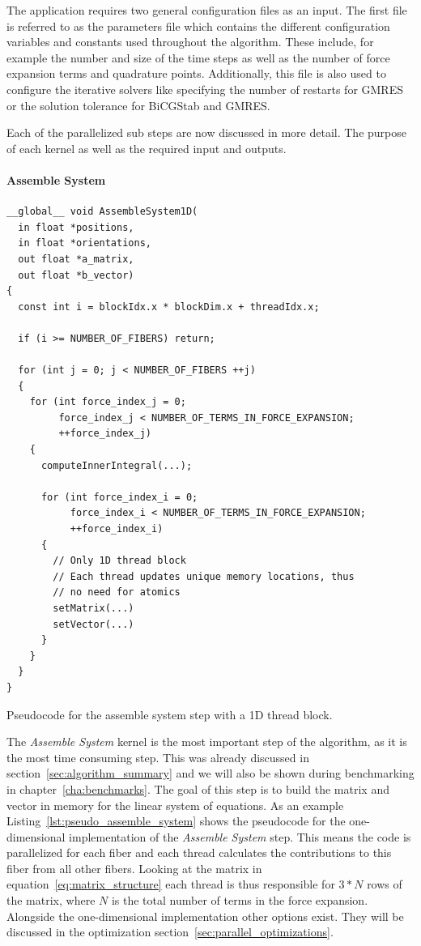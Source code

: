 \documentclass[a4paper,11pt]{kth-mag}
\begin{document}
The application requires two general configuration files as an input. The first file is referred to as the parameters file which contains the different configuration variables and constants used throughout the algorithm. These include, for example the number and size of the time steps as well as the number of force expansion terms and quadrature points. Additionally, this file is also used to configure the iterative solvers like specifying the number of restarts for GMRES or the solution tolerance for BiCGStab and GMRES.

Each of the parallelized sub steps are now discussed in more detail. The purpose of each kernel as well as the required input and outputs.

\paragraph{Assemble System}

\begin{listing}[!htbp]
  \centering
  \begin{verbatim}
__global__ void AssembleSystem1D(
  in float *positions,
  in float *orientations,
  out float *a_matrix,
  out float *b_vector)
{
  const int i = blockIdx.x * blockDim.x + threadIdx.x;

  if (i >= NUMBER_OF_FIBERS) return;

  for (int j = 0; j < NUMBER_OF_FIBERS ++j)
  {
    for (int force_index_j = 0;
         force_index_j < NUMBER_OF_TERMS_IN_FORCE_EXPANSION;
         ++force_index_j)
    {
      computeInnerIntegral(...);

      for (int force_index_i = 0;
           force_index_i < NUMBER_OF_TERMS_IN_FORCE_EXPANSION;
           ++force_index_i)
      {
        // Only 1D thread block
        // Each thread updates unique memory locations, thus
        // no need for atomics
        setMatrix(...)
        setVector(...)
      }
    }
  }
}
  \end{verbatim}
  \caption{Pseudocode for the assemble system step with a 1D thread block.}
  \label{lst:pseudo_assemble_system}
\end{listing}

The \emph{Assemble System} kernel is the most important step of the algorithm, as it is the most time consuming step. This was already discussed in section~\ref{sec:algorithm_summary} and we will also be shown during benchmarking in chapter~\ref{cha:benchmarks}. The goal of this step is to build the matrix and vector in memory for the linear system of equations. As an example Listing~\ref{lst:pseudo_assemble_system} shows the pseudocode for the one-dimensional implementation of the \emph{Assemble System} step. This means the code is parallelized for each fiber and each thread calculates the contributions to this fiber from all other fibers. Looking at the matrix in equation~\eqref{eq:matrix_structure} each thread is thus responsible for $3*N$ rows of the matrix, where $N$ is the total number of terms in the force expansion. Alongside the one-dimensional implementation other options exist. They will be discussed in the optimization section~\ref{sec:parallel_optimizations}.
\end{document}
